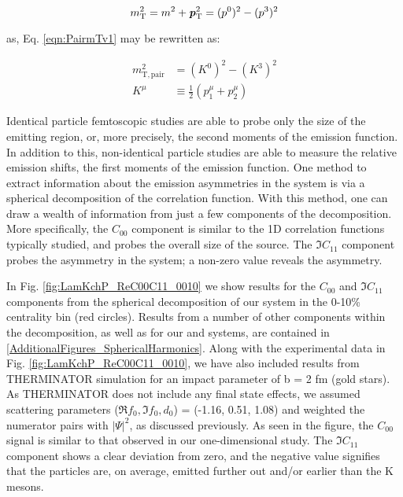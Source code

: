 \documentclass[/home/jesse/Analysis/FemtoAnalysis/AnalysisNotes/AnalysisNoteJBuxton.tex]{subfiles}
\begin{document}
\begin{equation}
 m_{\mathrm{T}}^{2} = m^{2} + \textbf{\textit{p}}_{\mathrm{T}}^{2} = (p^{0})^{2} - (p^{3})^{2}
\label{eqn:SinglemT}
\end{equation}

as, Eq. \ref{eqn:PairmTv1} may be rewritten as:



\begin{equation}
\begin{aligned}
m_{\mathrm{T, pair}}^{2} &= (K^{0})^{2} - (K^{3})^{2} \\
K^{\mu} & \equiv \frac{1}{2} \left( p_{1}^{\mu} + p_{2}^{\mu} \right)
\end{aligned}
\label{eqn:PairmTv2}
\end{equation}



Identical particle femtoscopic studies are able to probe only the size of the emitting region, or, more precisely, the second moments of the emission function.
In addition to this, non-identical particle studies are able to measure the relative emission shifts, the first moments of the emission function.
One method to extract information about the emission asymmetries in the system is via a spherical decomposition of the correlation function.
With this method, one can draw a wealth of information from just a few components of the decomposition.
More specifically, the $C_{00}$ component is similar to the 1D correlation functions typically studied, and probes the overall size of the source.
The $\Im C_{11}$ component probes the asymmetry in the system; a non-zero value reveals the asymmetry. 

In Fig. \ref{fig:LamKchP_ReC00C11_0010} we show results for the $C_{00}$ and $\Im C_{11}$ components from the spherical decomposition of our \LamKchP system in the 0-10\% centrality bin (red circles).
Results from a number of other components within the decomposition, as well as for our \LamKs and \LamKchM systems, are contained in \ref{AdditionalFigures_SphericalHarmonics}.
Along with the experimental data in Fig. \ref{fig:LamKchP_ReC00C11_0010}, we have also included results from THERMINATOR simulation for an impact parameter of b = 2 fm (gold stars).
As THERMINATOR does not include any final state effects, we assumed scattering parameters ($\Re f_{0}, \Im f_{0}, d_{0}$) = (-1.16, 0.51, 1.08) and weighted the numerator pairs with $|\Psi|^{2}$, as discussed previously.
As seen in the figure, the $C_{00}$ signal is similar to that observed in our one-dimensional study.
The $\Im C_{11}$ component shows a clear deviation from zero, and the negative value signifies that the \Lam particles are, on average, emitted further out and/or earlier than the K mesons.
\end{document}
